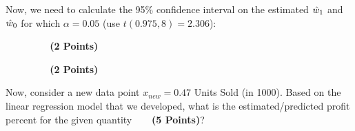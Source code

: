 \documentclass[12pt, xcolor=dvipsnames,svgnames,x11names]{article}
\begin{document}
Now, we need to calculate the 95\% confidence interval on the estimated ${\hat w}_1$ and ${\hat w}_0$ for which $\alpha = 0.05$ (use $t(0.975, 8) = 2.306$):


\begin{figure}[h]
\textbf{~~~(2 Points)}
\end{figure}



\begin{figure}[h]
\textbf{~~~(2 Points)}
\end{figure}


Now, consider a new data point $x_{new} = 0.47$ Units Sold (in 1000). Based on the linear regression model that we developed, what is the estimated/predicted profit percent for the given quantity \textbf{~~~(5 Points)}?
\end{document}

